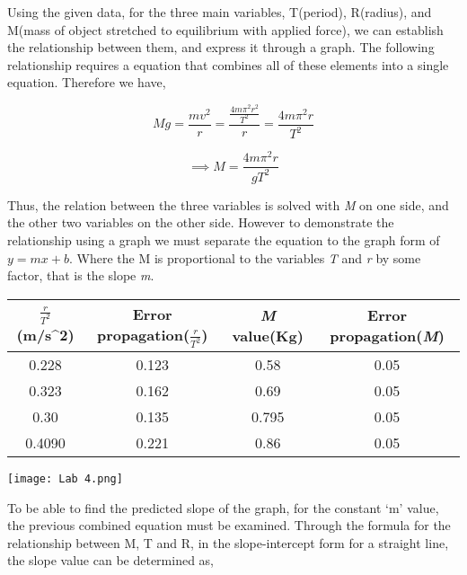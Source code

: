 	{Using the given data, for the three main variables, T(period), R(radius), and M(mass of object stretched to equilibrium with applied force), we can establish the relationship between them, and express it through a graph. The following relationship requires a equation that combines all of these elements into a single equation. Therefore we have,}

		$$Mg = \frac{mv^2}{r} = \frac{\frac{4m\pi^2 r^2}{T^2}}{r} = \frac{4m\pi^2 r}{T^2} $$

		$$\implies M = \frac{4m\pi^2 r}{gT^2}$$

	{Thus, the relation between the three variables is solved with \textit{M} on one side, and the other two
variables on the other side. However to demonstrate the relationship using a graph we must
separate the equation to the graph form of $y = mx + b$. Where the M is proportional to the
variables \textit{T} and \textit{r} by some factor, that is the slope \textit{m}.}

\begin{table}[H]
\centering
\begin{tabular}{cccc}
\hline
\multicolumn{1}{c}{$\frac{r}{T^2}$(m/s\textasciicircum{}2)} & Error propagation($\frac{r}{T^2}$) & \textit{M} value(Kg) & Error propagation(\textit{M}) \\ \hline
0.228                                                                       & 0.123                                     & 0.58        & 0.05                 \\
0.323                                                                       & 0.162                                     & 0.69        & 0.05                 \\
0.30                                                                        & 0.135                                     & 0.795       & 0.05                 \\
0.4090                                                                      & 0.221                                     & 0.86        & 0.05                 \\ \hline
\end{tabular}
\end{table}

	\texttt{[image: Lab	 4.png]}

	{To be able to find the predicted slope of the graph, for the constant ‘m’ value, the previous
combined equation must be examined. Through the formula for the relationship between M, T
and R, in the slope-intercept form for a straight line, the slope value can be determined as,}

